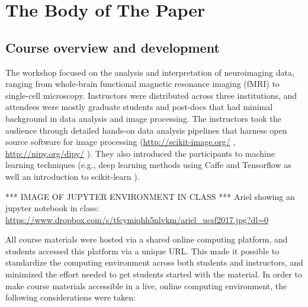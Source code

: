 \section{The Body of The Paper}

\subsection{Course overview and development}

The workshop focused on the analysis and interpretation of neuroimaging data,
ranging from whole-brain functional magnetic resonance imaging (fMRI) to
single-cell microscopy. Instructors were distributed across three institutions,
and attendees were mostly graduate students and post-docs that had minimal
background in data analysis and image processing. The instructors took the
audience through detailed hands-on data analysis pipelines that harness open
source software for image processing  (\url{http://scikit-image.org/}
\cite{van2014scikit}, \url{http://nipy.org/dipy/}
\cite{Garyfallidis2014FrontNeuroinf}). They also introduced the participants to
machine learning techniques (e.g., deep learning methods using Caffe
\cite{jia2014caffe} and Tensorflow \cite{abadi2016tensorflow} as well an
introduction to scikit-learn \cite{Pedregosa2012-dm}).

*** IMAGE OF JUPYTER ENVIRONMENT IN CLASS ***
Ariel showing an jupyter notebook in class: \url{https://www.dropbox.com/s/tfcymiqhh5nlvkm/ariel_ucsf2017.jpg?dl=0}

All course materials were hosted via a shared online computing platform, and
students accessed this platform via a unique URL. This made it possible to
standardize the computing environment across both students and instructors,
and minimized the effort needed to get students started with
the material. In order to make course materials accessible in a live, online
computing environment, the following considerations were taken:

